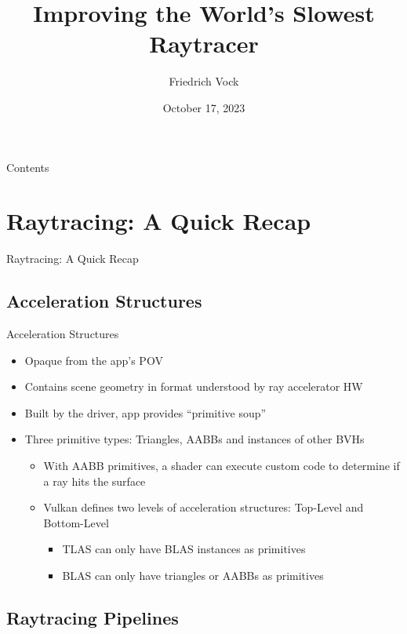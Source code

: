\documentclass[aspectratio=169,t]{beamer}
\author{Friedrich Vock}
\title{Improving the World's Slowest Raytracer}
\date{October 17, 2023}
\begin{document}
\begin{slide}
\titlepage
\end{slide}


\begin{slide}{Contents}
\tableofcontents
\end{slide}

\section{Raytracing: A Quick Recap}

\chapterIntroConfig
\begin{slide}{Raytracing: A Quick Recap}
\end{slide}

\subsection{Acceleration Structures}
\begin{slide}{Acceleration Structures}
    \begin{itemize}
     \item Opaque from the app's POV
     \item Contains scene geometry in format understood by ray accelerator HW
     \item Built by the driver, app provides ``primitive soup''
     \item Three primitive types: Triangles, AABBs and instances of other BVHs
     \begin{itemize}
      \item With AABB primitives, a shader can execute custom code to determine if a ray hits the surface
      \item Vulkan defines two levels of acceleration structures: Top-Level and Bottom-Level
      \begin{itemize}
        \item TLAS can only have BLAS instances as primitives
        \item BLAS can only have triangles or AABBs as primitives
      \end{itemize}
     \end{itemize}
    \end{itemize}
\end{slide}
\subsection{Raytracing Pipelines}
\end{document}

